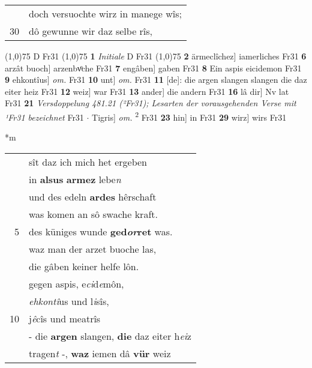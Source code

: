 \documentclass[8pt,a4paper,notitlepage]{article}
\begin{document}
\begin{table}[ht]
\begin{minipage}[t]{0.5\linewidth}
\begin{tabular}{rl}
 & doch versuochte wirz in manege wîs;\\ 
30 & dô gewunne wir daz selbe rîs,\\ 
\end{tabular}
\scriptsize
\line(1,0){75} \newline
D Fr31 \newline
\line(1,0){75} \newline
\textbf{1} \textit{Initiale} D Fr31  \newline
\line(1,0){75} \newline
\textbf{2} ärmeclîchez] iamerliches Fr31 \textbf{6} arzât buoch] arzenbvͦche Fr31 \textbf{7} engâben] gaben Fr31 \textbf{8} Ein aspis eicidemon Fr31 \textbf{9} ehkontîus] \textit{om.} Fr31 \textbf{10} unt] \textit{om.} Fr31 \textbf{11} [de]: die argen slangen slangen die daz eiter heiz Fr31 \textbf{12} weiz] war Fr31 \textbf{13} ander] die andern Fr31 \textbf{16} lâ dir] Nv lat Fr31 \textbf{21} \textit{Versdoppelung 481.21 (²Fr31); Lesarten der vorausgehenden Verse mit ¹Fr31 bezeichnet} Fr31   $\cdot$ Tigris] \textit{om.} \textsuperscript{2}\hspace{-1.3mm} Fr31 \textbf{23} hin] in Fr31 \textbf{29} wirz] wirs Fr31 \newline
\end{minipage}
\hspace{0.5cm}
\begin{minipage}[t]{0.5\linewidth}
\small
\begin{center}*m
\end{center}
\begin{tabular}{rl}
 & sît daz ich mich het ergeben\\ 
 & in \textbf{alsus} \textbf{armez} lebe\textit{n}\\ 
 & und des edeln \textbf{ardes} hêrschaft\\ 
 & was komen an sô swache kraft.\\ 
5 & des küniges wunde \textbf{ged\textit{or}ret} was.\\ 
 & waz man der arzet buoche las,\\ 
 & die gâben keiner helfe lôn.\\ 
 & gegen aspis, e\textit{ci}d\textit{e}môn,\\ 
 & \textit{ehkontî}us und l\textit{i}sîs,\\ 
10 & j\textit{ê}cîs und meatrîs\\ 
 & - die \textbf{argen} slangen, \textbf{die} daz eiter h\textit{ei}z\\ 
 & tragen\textit{t} -, \textbf{waz} iemen dâ \textbf{vür} weiz\\ 

\end{tabular}
\end{minipage}
\end{table}
\end{document}
